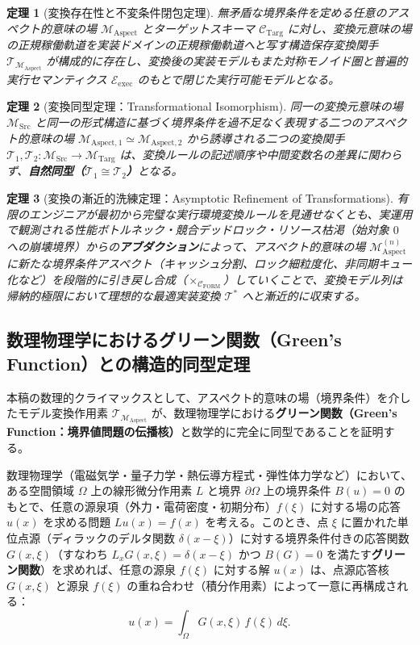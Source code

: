 \documentclass[11pt,a4paper]{ltjsarticle}
\theoremstyle{definition}
\theoremstyle{plain}
\newtheorem{theorem}{定理}[section]
\theoremstyle{remark}
\newcommand{\CFORM}{\mathcal{C}_{\mathrm{FORM}}}
\newcommand{\CTarg}{\mathcal{C}_{\mathrm{Targ}}}
\newcommand{\MSrc}{\mathcal{M}_{\mathrm{Src}}}
\newcommand{\MTarg}{\mathcal{M}_{\mathrm{Targ}}}
\newcommand{\MAspect}{\mathcal{M}_{\mathrm{Aspect}}}
\newcommand{\Eexec}{\mathcal{E}_{\mathrm{exec}}}
\begin{document}
\begin{theorem}[変換存在性と不変条件閉包定理]\label{thm:trans-existence}
無矛盾な境界条件を定める任意のアスペクト的意味の場 $\MAspect$ とターゲットスキーマ $\CTarg$ に対し、変換元意味の場の正規稼働軌道を実装ドメインの正規稼働軌道へと写す構造保存変換関手 $\mathcal{T}_{\MAspect}$ が構成的に存在し、変換後の実装モデルもまた対称モノイド圏と普遍的実行セマンティクス $\Eexec$ のもとで閉じた実行可能モデルとなる。
\end{theorem}

\begin{theorem}[変換同型定理：Transformational Isomorphism]\label{thm:trans-isomorphism}
同一の変換元意味の場 $\MSrc$ と同一の形式構造に基づく境界条件を過不足なく表現する二つのアスペクト的意味の場 $\mathcal{M}_{\mathrm{Aspect}, 1} \simeq \mathcal{M}_{\mathrm{Aspect}, 2}$ から誘導される二つの変換関手 $\mathcal{T}_1, \mathcal{T}_2 : \MSrc \to \MTarg$ は、変換ルールの記述順序や中間変数名の差異に関わらず、\textbf{自然同型（$\mathcal{T}_1 \cong \mathcal{T}_2$）}となる。
\end{theorem}

\begin{theorem}[変換の漸近的洗練定理：Asymptotic Refinement of Transformations]\label{thm:trans-asymptotic}
有限のエンジニアが最初から完璧な実行環境変換ルールを見通せなくとも、実運用で観測される性能ボトルネック・競合デッドロック・リソース枯渇（始対象 $0$ への崩壊境界）からの\textbf{アブダクション}によって、アスペクト的意味の場 $\MAspect^{(n)}$ に新たな境界条件アスペクト（キャッシュ分割、ロック細粒度化、非同期キュー化など）を段階的に引き戻し合成（$\times_{\CFORM}$）していくことで、変換モデル列は帰納的極限において理想的な最適実装変換 $\mathcal{T}^*$ へと漸近的に収束する。
\end{theorem}

\subsection{数理物理学におけるグリーン関数（Green's Function）との構造的同型定理}
本稿の数理的クライマックスとして、アスペクト的意味の場（境界条件）を介したモデル変換作用素 $\mathcal{T}_{\MAspect}$ が、数理物理学における\textbf{グリーン関数（Green's Function：境界値問題の伝播核）}と数学的に完全に同型であることを証明する。

数理物理学（電磁気学・量子力学・熱伝導方程式・弾性体力学など）において、ある空間領域 $\Omega$ 上の線形微分作用素 $L$ と境界 $\partial\Omega$ 上の境界条件 $B(u) = 0$ のもとで、任意の源泉項（外力・電荷密度・初期分布）$f(\xi)$ に対する場の応答 $u(x)$ を求める問題 $L u(x) = f(x)$ を考える。このとき、点 $\xi$ に置かれた単位点源（ディラックのデルタ関数 $\delta(x - \xi)$）に対する境界条件付きの応答関数 $G(x, \xi)$（すなわち $L_x G(x, \xi) = \delta(x - \xi)$ かつ $B(G) = 0$ を満たす\textbf{グリーン関数}）を求めれば、任意の源泉 $f(\xi)$ に対する解 $u(x)$ は、点源応答核 $G(x, \xi)$ と源泉 $f(\xi)$ の重ね合わせ（積分作用素）によって一意に再構成される：
\begin{equation}
u(x) = \int_{\Omega} G(x, \xi)\, f(\xi)\, d\xi.
\end{equation}
\end{document}
